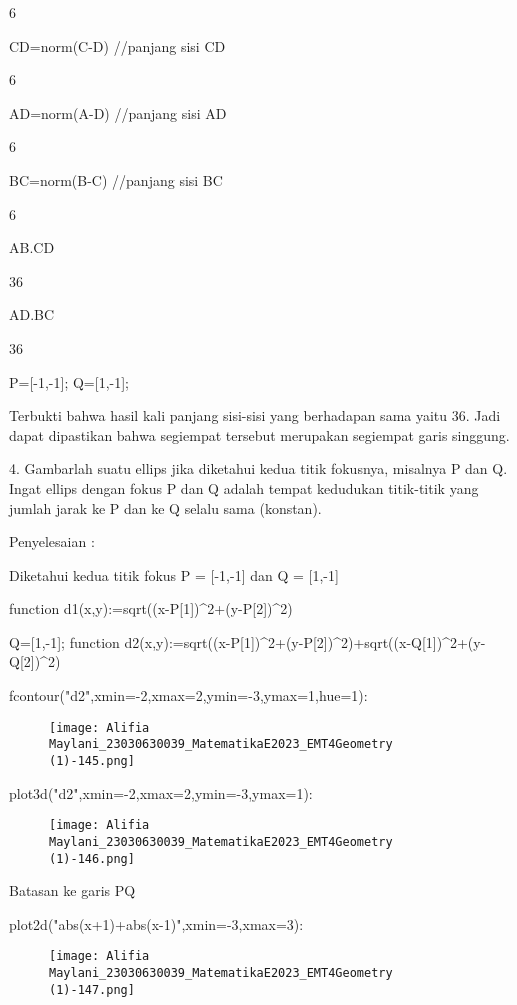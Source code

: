 \documentclass{article}
\begin{document}
    6

\>CD=norm(C-D) //panjang sisi CD


    6

\>AD=norm(A-D) //panjang sisi AD


    6

\>BC=norm(B-C) //panjang sisi BC


    6

\>AB.CD


    36

\>AD.BC


    36

\>P=[-1,-1]; Q=[1,-1];


Terbukti bahwa hasil kali panjang sisi-sisi yang berhadapan sama yaitu
36. Jadi dapat dipastikan bahwa segiempat tersebut merupakan segiempat
garis singgung.


4. Gambarlah suatu ellips jika diketahui kedua titik fokusnya,
misalnya P dan Q. Ingat ellips dengan fokus P dan Q adalah tempat
kedudukan titik-titik yang jumlah jarak ke P dan ke Q selalu sama
(konstan).


Penyelesaian :


Diketahui kedua titik fokus P = [-1,-1] dan Q = [1,-1]


\>function d1(x,y):=sqrt((x-P[1])^2+(y-P[2])^2)

\>Q=[1,-1]; function d2(x,y):=sqrt((x-P[1])^2+(y-P[2])^2)+sqrt((x-Q[1])^2+(y-Q[2])^2)

\>fcontour("d2",xmin=-2,xmax=2,ymin=-3,ymax=1,hue=1):


\begin{figure}
    \centering
    \texttt{[image: Alifia Maylani\_23030630039\_MatematikaE2023\_EMT4Geometry (1)-145.png]}
    \caption{}
    \label{fig:enter-label}
\end{figure}

\>plot3d("d2",xmin=-2,xmax=2,ymin=-3,ymax=1):


\begin{figure}
    \centering
    \texttt{[image: Alifia Maylani\_23030630039\_MatematikaE2023\_EMT4Geometry (1)-146.png]}
    \caption{}
    \label{fig:enter-label}
\end{figure}

Batasan ke garis PQ


\>plot2d("abs(x+1)+abs(x-1)",xmin=-3,xmax=3):


\begin{figure}
    \centering
    \texttt{[image: Alifia Maylani\_23030630039\_MatematikaE2023\_EMT4Geometry (1)-147.png]}
    \caption{}
    \label{fig:enter-label}
\end{figure}
\end{document}
